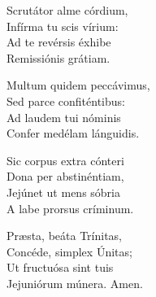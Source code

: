 Scrutátor alme córdium,\\
Infírma tu scis vírium:\\
Ad te revérsis éxhibe\\
Remissiónis grátiam.

Multum quidem peccávimus,\\
Sed parce confiténtibus:\\
Ad laudem tui nóminis\\
Confer medélam lánguidis.

Sic corpus extra cónteri\\
Dona per abstinéntiam,\\
Jejúnet ut mens sóbria\\
A labe prorsus críminum.

Præsta, beáta Trínitas,\\
Concéde, simplex Únitas;\\
Ut fru\-ctuósa sint tuis\\
Jejuniórum múnera.
Amen.